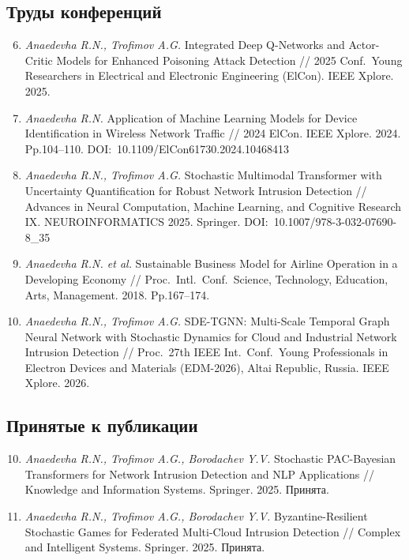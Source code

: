 \documentclass[12pt,a5paper]{article}
\begin{document}
\subsection*{Труды конференций}

\begin{enumerate}
\setcounter{enumi}{5}
\item \textit{Anaedevha R.N., Trofimov A.G.} Integrated Deep Q-Networks and Actor-Critic Models for Enhanced Poisoning Attack Detection // 2025 Conf.\ Young Researchers in Electrical and Electronic Engineering (ElCon). IEEE Xplore. 2025.

\item \textit{Anaedevha R.N.} Application of Machine Learning Models for Device Identification in Wireless Network Traffic // 2024 ElCon. IEEE Xplore. 2024. Pp.104--110. DOI:~10.1109/ElCon61730.2024.10468413

\item \textit{Anaedevha R.N., Trofimov A.G.} Stochastic Multimodal Transformer with Uncertainty Quantification for Robust Network Intrusion Detection // Advances in Neural Computation, Machine Learning, and Cognitive Research IX. NEUROINFORMATICS 2025. Springer. DOI:~10.1007/978-3-032-07690-8\_35

\item \textit{Anaedevha R.N. et al.} Sustainable Business Model for Airline Operation in a Developing Economy // Proc.\ Intl.\ Conf.\ Science, Technology, Education, Arts, Management. 2018. Pp.167--174.

\item \textit{Anaedevha R.N., Trofimov A.G.} SDE-TGNN: Multi-Scale Temporal Graph Neural Network with Stochastic Dynamics for Cloud and Industrial Network Intrusion Detection // Proc.\ 27th IEEE Int.\ Conf.\ Young Professionals in Electron Devices and Materials (EDM-2026), Altai Republic, Russia. IEEE Xplore. 2026.
\end{enumerate}

\subsection*{Принятые к публикации}

\begin{enumerate}
\setcounter{enumi}{9}
\item \textit{Anaedevha R.N., Trofimov A.G., Borodachev Y.V.} Stochastic PAC-Bayesian Transformers for Network Intrusion Detection and NLP Applications // Knowledge and Information Systems. Springer. 2025. Принята.

\item \textit{Anaedevha R.N., Trofimov A.G., Borodachev Y.V.} Byzantine-Resilient Stochastic Games for Federated Multi-Cloud Intrusion Detection // Complex and Intelligent Systems. Springer. 2025. Принята.
\end{enumerate}
\end{document}
